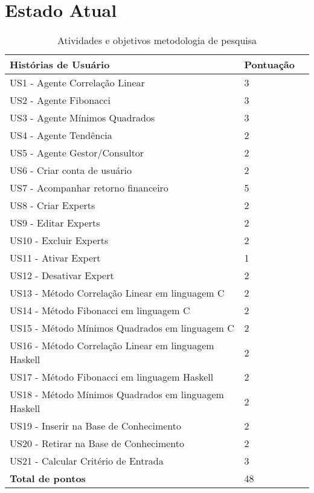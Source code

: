 \chapter{Estado Atual}


\begin{table}[htp]
\caption{Atividades e objetivos metodologia de pesquisa}
\begin{center}
    \begin{tabular}{ | p{5cm} | p{4cm} | p{4cm}|}
    \hline
    \textbf{Histórias de Usuário} & \textbf{Pontuação} \\ \hline

US1 - Agente Correlação Linear & 3\\ \hline
US2 - Agente Fibonacci & 3 \\ \hline
US3 - Agente Mínimos Quadrados & 3\\ \hline
US4 -  Agente Tendência & 2 \\ \hline
US5 - Agente Gestor/Consultor & 2\\ \hline
US6 - Criar conta de usuário & 2\\ \hline
US7 - Acompanhar retorno financeiro & 5\\ \hline
US8 - Criar Experts & 2\\ \hline
US9 - Editar Experts & 2\\ \hline
US10 - Excluir Experts & 2\\ \hline
US11 - Ativar Expert & 1\\ \hline
US12 - Desativar Expert & 2 \\ \hline
US13 - Método Correlação Linear em linguagem C & 2\\ \hline
US14 - Método Fibonacci em linguagem C & 2\\ \hline
US15 - Método Mínimos Quadrados em linguagem C & 2\\ \hline
US16 - Método Correlação Linear em linguagem Haskell & 2\\ \hline
US17 - Método Fibonacci em linguagem Haskell & 2\\ \hline
US18 - Método Mínimos Quadrados em linguagem Haskell & 2\\ \hline
US19 - Inserir na Base de Conhecimento & 2\\ \hline
US20 - Retirar na Base de Conhecimento & 2\\ \hline
US21 - Calcular Critério de Entrada & 3\\ \hline
\textbf{Total de pontos} & 48\\ \hline
\end{tabular}
\end{center}
\label{estadoAtual}
\end{table}
